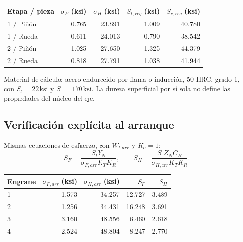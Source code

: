 \documentclass[11pt,a4paper]{article}
\newcommand{\ksi}{\,\mathrm{ksi}}
\begin{document}
\begin{center}\small\begin{tabular}{lrrrr}\toprule

Etapa / pieza & $\sigma_F$ (ksi) & $\sigma_H$ (ksi) & $S_{t,req}$ (ksi) & $S_{c,req}$ (ksi) \\ \midrule

1 / Piñón & 0.765 & 23.891 & 1.009 & 40.780 \\

1 / Rueda & 0.611 & 24.013 & 0.790 & 38.542 \\

2 / Piñón & 1.025 & 27.650 & 1.325 & 44.379 \\

2 / Rueda & 0.818 & 27.791 & 1.038 & 41.944 \\

\bottomrule\end{tabular}\end{center}

Material de cálculo: acero endurecido por flama o inducción, 50 HRC, grado 1, con $S_t=22\ksi$ y $S_c=170\ksi$. La dureza superficial por sí sola no define las propiedades del núcleo del eje.

\subsection{Verificación explícita al arranque}
Mismas ecuaciones de esfuerzo, con $W_{t,arr}$ y $K_o=1$:
\[
S_F=\frac{S_tY_N}{\sigma_{F,arr}K_TK_R},\qquad
S_H=\frac{S_cZ_NC_H}{\sigma_{H,arr}K_TK_R}.
\]

\begin{center}\small\begin{tabular}{lrrrr}\toprule

Engrane & $\sigma_{F,arr}$ (ksi) & $\sigma_{H,arr}$ (ksi) & $S_F$ & $S_H$ \\ \midrule

1 & 1.573 & 34.257 & 12.727 & 3.489 \\

2 & 1.256 & 34.431 & 16.248 & 3.691 \\

3 & 3.160 & 48.556 & 6.460 & 2.618 \\

4 & 2.524 & 48.804 & 8.247 & 2.770 \\

\bottomrule\end{tabular}\end{center}
\end{document}
